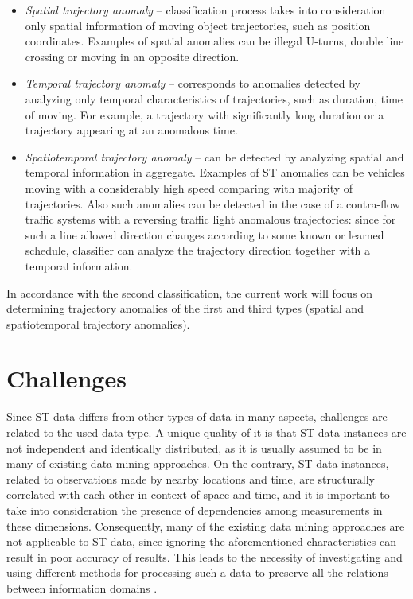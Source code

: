 \begin{itemize}
	\setlength\itemsep{0em}
	\item \textit{Spatial trajectory anomaly} -- classification process takes into consideration only spatial information of moving object trajectories, such as position coordinates. Examples of spatial anomalies can be illegal U-turns, double line crossing or moving in an opposite direction.
	\item \textit{Temporal trajectory anomaly} -- corresponds to anomalies detected by analyzing only temporal characteristics of trajectories, such as duration, time of moving. For example, a trajectory with significantly long duration or a trajectory appearing at an anomalous time.
	\item \textit{Spatiotemporal trajectory anomaly} -- can be detected by analyzing spatial and temporal information in aggregate. Examples of ST anomalies can be vehicles moving with a considerably high speed comparing with majority of trajectories. Also such anomalies can be detected in the case of a contra-flow traffic systems with a reversing traffic light anomalous trajectories: since for such a line allowed direction changes according to some known or learned schedule, classifier can analyze the trajectory direction together with a temporal information.
\end{itemize}

In accordance with the second classification, the current work will focus on determining trajectory anomalies of the first and third types (spatial and spatiotemporal trajectory anomalies).

\section{Challenges}
Since ST data differs from other types of data in many aspects, challenges are related to the used data type. A unique quality of it is that ST data instances are not independent and identically distributed, as it is usually assumed to be in many of existing data mining approaches. On the contrary, ST data instances, related to observations made by nearby locations and time, are structurally correlated with each other in context of space and time, and it is important to take into consideration the presence of dependencies among measurements in these dimensions. Consequently, many of the existing data mining approaches are not applicable to ST data, since ignoring the aforementioned characteristics can result in poor accuracy of results. This leads to the necessity of investigating and using different methods for processing such a data to preserve all the relations between information domains \cite{article:1_survey_stdm}.

